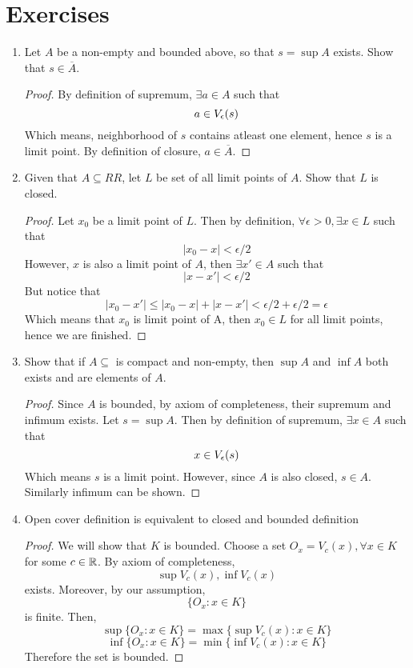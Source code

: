\section{Exercises}
\begin{enumerate}
    \item Let $A$ be a non-empty and bounded above, so that $s = \sup A$ exists. Show that $s \in \overline{A}$.
          \begin{proof}
              By definition of supremum, $\exists a \in A$ such that
              \[ a \in V_{\epsilon}(s)\]
              Which means, neighborhood of $s$ contains atleast one element, hence $s$ is a limit point. By definition of closure, $a \in \overline{A}$.
          \end{proof}
    \item  Given that $A \subseteq RR$, let $L$ be set of all limit points of $A$. Show that $L$ is closed.
          \begin{proof}
              Let $x_0$ be a limit point of $L$. Then by definition, $\forall \epsilon > 0, \exists x \in L$ such that
              \[ |x_0 - x| < \epsilon/2\]
              However, $x$ is also a limit point of $A$, then $\exists x' \in A$ such that
              \[ |x - x'| < \epsilon/2\]
              But notice that
              \[ |x_0 - x'| \le |x_0 - x| + |x - x'| < \epsilon/2 + \epsilon/2 = \epsilon\]
              Which means that $x_0$ is limit point of A, then $x_0 \in L$ for all limit points, hence we are finished.
          \end{proof}
    \item Show that if $A \subseteq$ is compact and non-empty, then $\sup A$ and $\inf A$ both exists and are elements of $A$.
          \begin{proof}
              Since $A$ is bounded, by axiom of completeness, their supremum and infimum exists. Let $s = \sup A$. Then by definition of supremum, $ \exists x \in A$ such that
              \[ x \in V_{\epsilon}(s)\]
              Which means $s$ is a limit point. However, since $A$ is also closed, $s \in A$. Similarly infimum can be shown.
          \end{proof}
    \item Open cover definition is equivalent to closed and bounded definition
          \begin{proof}
              We will show that $K$ is bounded.
              Choose a set $O_x = V_{c}(x),\forall x \in K$ for some $c \in {\mathbb{R}}$. By axiom of completeness,
              \[ \sup V_c(x), \inf V_c(x)\]
              exists. Moreover, by our assumption,
              \[ \{ O_x : x \in K\}\]
              is finite. Then,
              \[\sup \{ O_x : x \in K\} = \max \{ \sup V_c(x) : x \in K \} \]
              \[\inf \{ O_x : x \in K\} = \min \{ \inf V_c(x) : x \in K \} \]
              Therefore the set is bounded.


\end{proof}
\end{enumerate}
